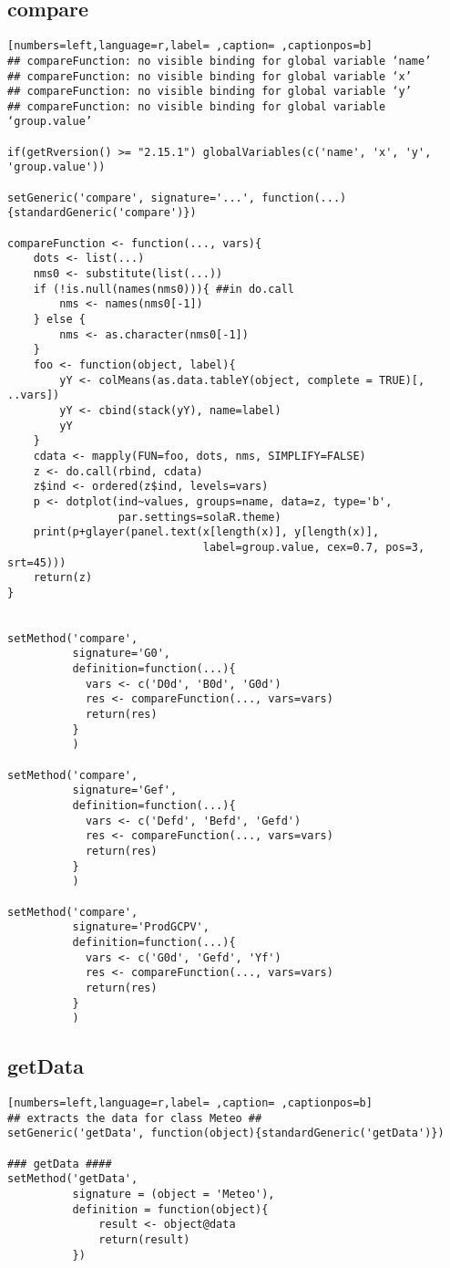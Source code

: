 \subsection{compare}
\label{sec:org0c8bb23}
\begin{lstlisting}[numbers=left,language=r,label= ,caption= ,captionpos=b]
## compareFunction: no visible binding for global variable ‘name’
## compareFunction: no visible binding for global variable ‘x’
## compareFunction: no visible binding for global variable ‘y’
## compareFunction: no visible binding for global variable ‘group.value’

if(getRversion() >= "2.15.1") globalVariables(c('name', 'x', 'y', 'group.value'))

setGeneric('compare', signature='...', function(...){standardGeneric('compare')})

compareFunction <- function(..., vars){
    dots <- list(...)
    nms0 <- substitute(list(...))
    if (!is.null(names(nms0))){ ##in do.call
        nms <- names(nms0[-1])
    } else {
        nms <- as.character(nms0[-1])
    }
    foo <- function(object, label){
        yY <- colMeans(as.data.tableY(object, complete = TRUE)[, ..vars])
        yY <- cbind(stack(yY), name=label)
        yY
    }
    cdata <- mapply(FUN=foo, dots, nms, SIMPLIFY=FALSE)
    z <- do.call(rbind, cdata)
    z$ind <- ordered(z$ind, levels=vars)
    p <- dotplot(ind~values, groups=name, data=z, type='b',
                 par.settings=solaR.theme)
    print(p+glayer(panel.text(x[length(x)], y[length(x)],
                              label=group.value, cex=0.7, pos=3, srt=45)))
    return(z)
}


setMethod('compare',
          signature='G0',
          definition=function(...){
            vars <- c('D0d', 'B0d', 'G0d')
            res <- compareFunction(..., vars=vars)
            return(res)
          }
          )

setMethod('compare',
          signature='Gef',
          definition=function(...){
            vars <- c('Defd', 'Befd', 'Gefd')
            res <- compareFunction(..., vars=vars)
            return(res)
          }
          )

setMethod('compare',
          signature='ProdGCPV',
          definition=function(...){
            vars <- c('G0d', 'Gefd', 'Yf')
            res <- compareFunction(..., vars=vars)
            return(res)
          }
          )
\end{lstlisting}
\subsection{getData}
\label{sec:org36348c0}
\begin{lstlisting}[numbers=left,language=r,label= ,caption= ,captionpos=b]
## extracts the data for class Meteo ##
setGeneric('getData', function(object){standardGeneric('getData')})

### getData ####
setMethod('getData',
          signature = (object = 'Meteo'),
          definition = function(object){
              result <- object@data
              return(result)
          })
\end{lstlisting}
